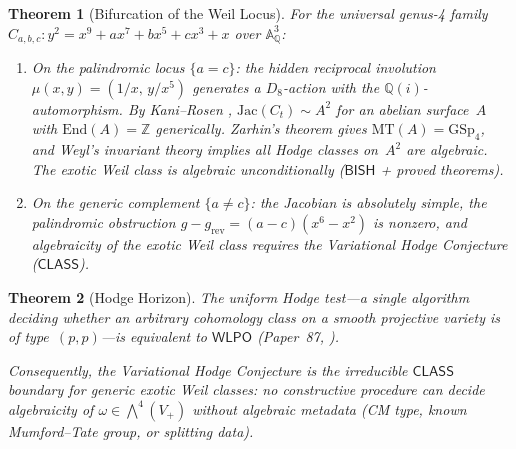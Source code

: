 \documentclass[11pt]{article}
\theoremstyle{plain}
\newtheorem{theorem}{Theorem}[section]
\theoremstyle{definition}
\theoremstyle{remark}
\newcommand{\ZZ}{\mathbb{Z}}
\newcommand{\QQ}{\mathbb{Q}}
\newcommand{\Aff}{\mathbb{A}}
\newcommand{\End}{\mathrm{End}}
\newcommand{\MT}{\mathrm{MT}}
\newcommand{\GSp}{\mathrm{GSp}}
\newcommand{\Jac}{\mathrm{Jac}}
\newcommand{\BISH}{\mathsf{BISH}}
\newcommand{\WLPO}{\mathsf{WLPO}}
\newcommand{\CLASS}{\mathsf{CLASS}}
\begin{document}
\begin{theorem}[Bifurcation of the Weil Locus]\label{thm:B}
For the universal genus-4 family
$C_{a,b,c}: y^2 = x^9 + ax^7 + bx^5 + cx^3 + x$
over $\Aff^3_{\QQ}$:
\begin{enumerate}[label=(\roman*)]
\item On the palindromic locus $\{a = c\}$: the hidden reciprocal
  involution $\mu(x,y) = (1/x,\, y/x^5)$ generates a $D_8$-action
  with the $\QQ(i)$-automorphism.  By Kani--Rosen \cite{kani-rosen},
  $\Jac(C_t) \sim A^2$ for an abelian surface~$A$ with
  $\End(A) = \ZZ$ generically.  Zarhin's theorem
  \cite{zarhin-endomorphisms} gives $\MT(A) = \GSp_4$, and Weyl's
  invariant theory \cite{weyl-classical} implies all Hodge classes
  on~$A^2$ are algebraic.  The exotic Weil class is algebraic
  \emph{unconditionally} ($\BISH$ + proved theorems).
\item On the generic complement $\{a \neq c\}$: the Jacobian
  is absolutely simple, the palindromic obstruction
  $g - g_{\mathrm{rev}} = (a-c)(x^6 - x^2)$ is nonzero, and
  algebraicity of the exotic Weil class requires the Variational
  Hodge Conjecture ($\CLASS$).
\end{enumerate}
\end{theorem}

\begin{theorem}[Hodge Horizon]\label{thm:C}
The uniform Hodge test---a single algorithm deciding whether an
arbitrary cohomology class on a smooth projective variety is of
type~$(p,p)$---is equivalent to $\WLPO$ (Paper~87, \cite{p87}).

Consequently, the Variational Hodge Conjecture is the irreducible
$\CLASS$ boundary for generic exotic Weil classes: no constructive
procedure can decide algebraicity of
$\omega \in \bigwedge^4(V_+)$ without algebraic metadata
(CM type, known Mumford--Tate group, or splitting data).
\end{theorem}
\end{document}
